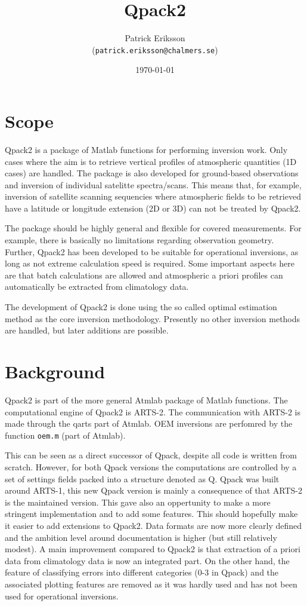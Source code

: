 \documentclass[a4paper,11pt]{article}
\title{Qpack2}
\author{Patrick Eriksson\\(\texttt{patrick.eriksson@chalmers.se})}
\date{\today}
\begin{document}
\maketitle

\section{Scope}
\label{sec:scope}
Qpack2 is a package of Matlab functions for performing inversion
work. Only cases where the aim is to retrieve vertical profiles of
atmospheric quantities (1D cases) are handled. The package is also
developed for ground-based observations and inversion of individual
satelitte spectra/scans. This means that, for example, inversion of
satellite scanning sequencies where atmospheric fields to be retrieved
have a latitude or longitude extension (2D or 3D) can not be treated
by Qpack2.

The package should be highly general and flexible for covered
measurements. For example, there is basically no limitations regarding
observation geometry. Further, Qpack2 has been developed to be
suitable for operational inversions, as long as not extreme
calculation speed is required. Some important aspects here are that
batch calculations are allowed and atmospheric a priori profiles can
automatically be extracted from climatology data.

The development of Qpack2 is done using the so called optimal
estimation method as the core inversion methodology. Presently no
other inversion methods are handled, but later additions are possible.



\section{Background}
\label{sec:background}
Qpack2 is part of the more general Atmlab package of Matlab functions.
The computational engine of Qpack2 is ARTS-2. The communication with
ARTS-2 is made through the qarts part of Atmlab. OEM inversions are
perfomred by the function \verb|oem.m| (part of Atmlab).

This can be seen as a direct successor of Qpack, despite all code is
written from scratch. However, for both Qpack versions the
computations are controlled by a set of settings fields packed into a
structure denoted as Q. Qpack was built around ARTS-1, this new Qpack
version is mainly a consequence of that ARTS-2 is the maintained
version. This gave also an oppertunity to make a more stringent
implementation and to add some features. This should hopefully make it
easier to add extensions to Qpack2. Data formats are now more clearly
defined and the ambition level around documentation is higher (but
still relatively modest). A main improvement compared to Qpack2 is
that extraction of a priori data from climatology data is now an
integrated part. On the other hand, the feature of classifying errors
into different categories (0-3 in Qpack) and the associated plotting
features are removed as it was hardly used and has not been used for
operational inversions.
\end{document}
